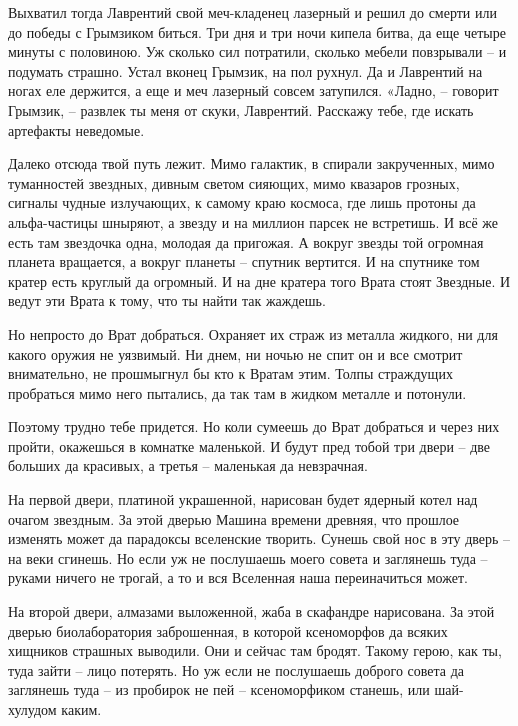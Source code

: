 \documentclass[ebook,oneside,final,openright]{memoir}
\begin{document}
Выхватил тогда Лаврентий свой меч-кладенец лазерный и решил до смерти или до победы с Грымзиком биться. Три дня и три ночи кипела битва, да еще четыре минуты с половиною. Уж сколько сил потратили, сколько мебели повзрывали – и подумать страшно. Устал вконец Грымзик, на пол рухнул. Да и Лаврентий на ногах еле держится, а еще и меч лазерный совсем затупился. «Ладно, – говорит Грымзик, – развлек ты меня от скуки, Лаврентий. Расскажу тебе, где искать артефакты неведомые.\par
\par
Далеко отсюда твой путь лежит. Мимо галактик, в спирали закрученных, мимо туманностей звездных, дивным светом сияющих, мимо квазаров грозных, сигналы чудные излучающих, к самому краю космоса, где лишь протоны да альфа-частицы шныряют, а звезду и на миллион парсек не встретишь. И всё же есть там звездочка одна, молодая да пригожая. А вокруг звезды той огромная планета вращается, а вокруг планеты – спутник вертится. И на спутнике том кратер есть круглый да огромный. И на дне кратера того Врата стоят Звездные. И ведут эти Врата к тому, что ты найти так жаждешь.\par
\par
Но непросто до Врат добраться. Охраняет их страж из металла жидкого, ни для какого оружия не уязвимый. Ни днем, ни ночью не спит он и все смотрит внимательно, не прошмыгнул бы кто к Вратам этим. Толпы страждущих пробраться мимо него пытались, да так там в жидком металле и потонули.\par
\par
Поэтому трудно тебе придется. Но коли сумеешь до Врат добраться и через них пройти, окажешься в комнатке маленькой. И будут пред тобой три двери – две больших да красивых, а третья – маленькая да невзрачная.\par
\par
На первой двери, платиной украшенной, нарисован будет ядерный котел над очагом звездным. За этой дверью Машина времени древняя, что прошлое изменять может да парадоксы вселенские творить. Сунешь свой нос в эту дверь – на веки сгинешь. Но если уж не послушаешь моего совета и заглянешь туда – руками ничего не трогай, а то и вся Вселенная наша переиначиться может.\par
\par
На второй двери, алмазами выложенной, жаба в скафандре нарисована. За этой дверью биолаборатория заброшенная, в которой ксеноморфов да всяких хищников страшных выводили. Они и сейчас там бродят. Такому герою, как ты, туда зайти – лицо потерять. Но уж если не послушаешь доброго совета да заглянешь туда – из пробирок не пей – ксеноморфиком станешь, или шай-хулудом каким.\par
\end{document}
